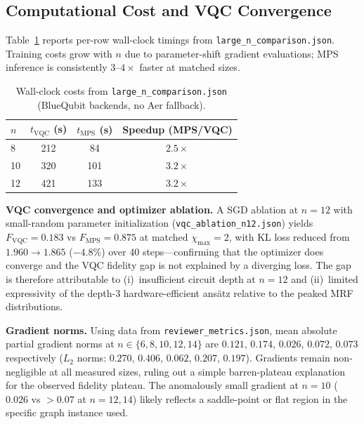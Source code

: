 \documentclass[conference,10pt]{IEEEtran}
\begin{document}
\subsection{Computational Cost and VQC Convergence}

Table~\ref{tab:timing} reports per-row wall-clock timings from \texttt{large\_n\_comparison.json}. Training costs grow with $n$ due to parameter-shift gradient evaluations; MPS inference is consistently $3$--$4\times$ faster at matched sizes.

\begin{table}[t]
\centering
\caption{Wall-clock costs from \texttt{large\_n\_comparison.json} (BlueQubit backends, no Aer fallback).}
\label{tab:timing}
\begin{tabular}{lccc}
\toprule
\textbf{$n$} & \textbf{$t_{\mathrm{VQC}}$ (s)} & \textbf{$t_{\mathrm{MPS}}$ (s)} & \textbf{Speedup (MPS/VQC)} \\
\midrule
 8 &  212 &  84 & $2.5\times$ \\
10 &  320 & 101 & $3.2\times$ \\
12 &  421 & 133 & $3.2\times$ \\
\bottomrule
\end{tabular}
\end{table}

\textbf{VQC convergence and optimizer ablation.} A SGD ablation at $n=12$ with small-random parameter initialization (\texttt{vqc\_ablation\_n12.json}) yields $F_{\mathrm{VQC}}=0.183$ vs $F_{\mathrm{MPS}}=0.875$ at matched $\chi_{\max}=2$, with KL loss reduced from $1.960\to1.865$ ($-4.8\%$) over 40 steps---confirming that the optimizer does converge and the VQC fidelity gap is not explained by a diverging loss. The gap is therefore attributable to (i)~insufficient circuit depth at $n=12$ and (ii)~limited expressivity of the depth-3 hardware-efficient ans\"atz relative to the peaked MRF distributions.\smallskip

\textbf{Gradient norms.} Using data from \texttt{reviewer\_metrics.json}, mean absolute partial gradient norms at $n\in\{6,8,10,12,14\}$ are $0.121$, $0.174$, $0.026$, $0.072$, $0.073$ respectively ($L_2$ norms: $0.270$, $0.406$, $0.062$, $0.207$, $0.197$). Gradients remain non-negligible at all measured sizes, ruling out a simple barren-plateau explanation~\cite{mcclean2018barren} for the observed fidelity plateau. The anomalously small gradient at $n=10$ ($0.026$ vs $>0.07$ at $n=12,14$) likely reflects a saddle-point or flat region in the specific graph instance used.
\end{document}
